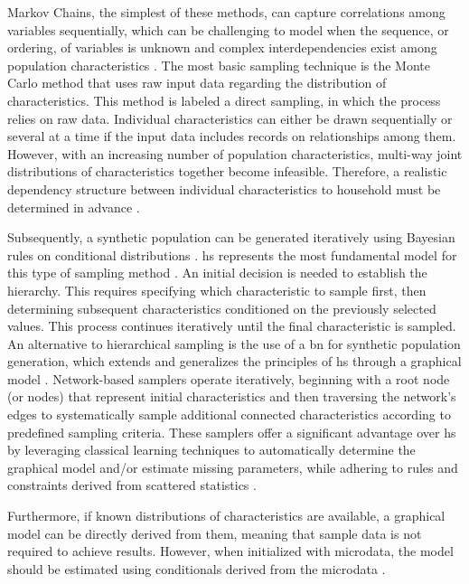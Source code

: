 ﻿\documentclass[../main.tex]{subfiles}
\begin{document}
Markov Chains, the simplest of these methods, can capture correlations among variables sequentially, which can be challenging to model when the sequence, or ordering, of variables is unknown and complex interdependencies exist among population characteristics \citep{Saadi2016HiddenSynthesis}. The most basic sampling technique is the Monte Carlo method  that uses raw input data regarding the distribution of characteristics. This method is labeled a direct sampling, in which the process relies on raw data. Individual characteristics can either be drawn sequentially or several at a time if the input data includes records on relationships among them. However, with an increasing number of population characteristics, multi-way joint distributions of characteristics together become infeasible. Therefore, a realistic dependency structure between individual characteristics to household must be determined in advance \citep{Sun2018ASynthesis}. 

Subsequently, a synthetic population can be generated iteratively using Bayesian rules on conditional distributions \citep{Gargiulo2010AnHouseholds}. \Gls{hs} represents the most fundamental model for this type of sampling method \citep{Barthelemy2012SyntheticSample}. An initial decision is needed to establish the hierarchy. This requires specifying which characteristic to sample first, then determining subsequent characteristics conditioned on the previously selected values. This process continues iteratively until the final characteristic is sampled.
An alternative to hierarchical sampling is the use of a \gls{bn} for synthetic population generation, which extends and generalizes the principles of \gls{hs} through a graphical model \citep{Sun2015ASynthesis,Ye2017PopulationSamples}. Network-based samplers operate iteratively, beginning with a root node (or nodes) that represent initial characteristics and then traversing the network's edges to systematically sample additional connected characteristics according to predefined sampling criteria. These samplers offer a significant advantage over \gls{hs} by leveraging classical learning techniques to automatically determine the graphical model and/or estimate missing parameters, while adhering to rules and constraints derived from scattered statistics \citep{Thiriot2008GenerateStatistics}.

Furthermore, if known distributions of characteristics are available, a graphical model can be directly derived from them, meaning that sample data is not required to achieve results. However, when initialized with microdata, the model should be estimated using conditionals derived from the microdata \citep{Sun2015ASynthesis}. 
\end{document}
